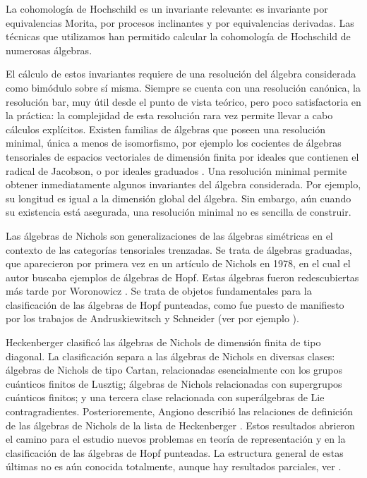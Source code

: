 \documentclass[fleqn,../tesis.tex]{subfiles}
\begin{document}
La cohomología de Hochschild es un invariante relevante: es invariante por equivalencias Morita, por procesos inclinantes y 
por equivalencias derivadas. Las técnicas que utilizamos han permitido calcular la cohomología de Hochschild de numerosas 
álgebras.

El cálculo de estos invariantes requiere de una resolución del álgebra considerada como bimódulo sobre sí misma. 
Siempre se cuenta con una 
resolución canónica, la resolución bar, muy útil desde el punto de vista teórico, pero poco satisfactoria en la práctica: la  
complejidad de 
esta resolución rara vez permite llevar a cabo cálculos explícitos. 
Existen familias de álgebras que poseen una resolución minimal, única a menos de isomorfismo, por ejemplo los cocientes de álgebras tensoriales 
de espacios vectoriales de dimensión finita por ideales que contienen el radical de Jacobson, o por ideales graduados \cite{BK}. Una resolución minimal permite obtener inmediatamente algunos invariantes del álgebra considerada. Por ejemplo, su longitud es igual a la dimensión global del álgebra. Sin embargo, aún cuando su existencia está asegurada, una resolución minimal no es sencilla de construir.

Las álgebras de Nichols son generalizaciones de las álgebras  simétricas  en el contexto de las categorías tensoriales trenzadas. 
Se trata de álgebras graduadas, que aparecieron por primera vez en un artículo de Nichols \cite{Ni} en 1978, en el cual el autor buscaba ejemplos 
de álgebras de Hopf. Estas álgebras fueron redescubiertas más tarde por Woronowicz \cite{Wo}.
Se trata de objetos fundamentales para la clasificación de las álgebras de Hopf 
punteadas, como fue puesto de manifiesto por los trabajos de Andruskiewitsch y Schneider (ver por ejemplo \cite{AS}).

Heckenberger clasificó las álgebras de Nichols de dimensión finita de tipo diagonal. La clasificación separa a las álgebras de Nichols en 
diversas clases: álgebras de Nichols de tipo Cartan, relacionadas esencialmente con los grupos cuánticos finitos de Lusztig; 
álgebras de Nichols relacionadas con supergrupos cuánticos finitos; 
y una tercera clase relacionada con superálgebras de Lie contragradientes. 
Posterioremente, Angiono describió las relaciones  de definición de las álgebras de Nichols de la lista de Heckenberger \cite{Ang}. 
Estos resultados abrieron el camino para  el estudio nuevos problemas en teoría de representación y en la clasificación de las álgebras de 
Hopf punteadas.
La estructura general de estas últimas no es aún conocida totalmente, aunque hay resultados parciales, ver \cite{AAH}. 
\end{document}
